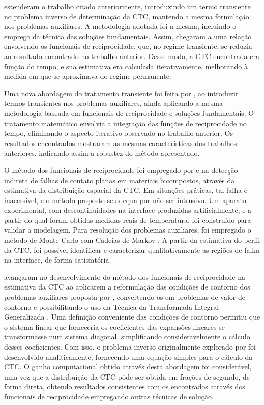 \cite{artigo_colaco_2} estenderam o trabalho citado anteriormente, introduzindo um termo transiente no problema inverso de determinação da CTC, mantendo a mesma formulação
nos problemas auxiliares. A
metodologia adotada foi a mesma, incluindo o emprego da técnica das soluções fundamentais. Assim, chegaram a uma relação envolvendo os funcionais de reciprocidade,
que, no regime transiente, se reduzia ao resultado encontrado no trabalho anterior. Desse modo, a CTC encontrada era função do tempo, e sua estimativa era calculada 
iterativamente, melhorando à medida em que se aproximava do regime permanente.

Uma nova abordagem do tratamento transiente foi feita por \cite{artigo_colaco_4},
ao introduzir termos transientes nos problemas auxiliares, ainda aplicando a mesma metodologia baseada em funcionais de reciprocidade e soluções fundamentais. O tratamento
matemático envolvia a integração das funções de reciprocidade no tempo, eliminando o aspecto iterativo observado no trabalho anterior. Os resultados encontrados mostraram
as mesmas características dos trabalhos anteriores, indicando assim a robustez do método apresentado.

O método dos funcionais de reciprocidade foi empregado por \cite{tese_abreu} e \cite{artigo_abreu_3} na detecção indireta de falhas de contato planas em materiais bicompostos, através da estimativa da distribuição espacial da CTC.
Em situações práticas, tal falha é inacessível, e o método proposto se adequa por não ser intrusivo. Um aparato experimental, com descontinuidades na interface produzidas artificialmente, e a partir
do qual foram obtidas medidas reais de temperatura, foi construído para validar a modelagem. Para resolução dos problemas auxiliares, foi empregado o método 
de Monte Carlo com Cadeias de Markov \citep{artigo_mcmc}. A partir da estimativa do perfil da CTC, foi possível identificar e caracterizar qualitativamente as regiões de falha na interface,
de forma satisfatória.

\cite{artigo_padilha_3} avançaram no desenvolvimento do método dos funcionais de reciprocidade na estimativa da CTC ao aplicarem a reformulação das condições de contorno 
dos problemas auxiliares proposta por \cite{tese_abreu}, convertendo-os em problemas de valor de contorno e possibilitando o uso da Técnica da Transformada Integral Generalizada \citep{livro_integral_transforms_cotta}.
Uma definição conveniente das condições de contorno permitiu que o sistema linear que forneceria os coeficientes das expansões lineares se transformasse num sistema diagonal, simplificando
consideravelmente o cálculo desses coeficientes. Com isso, 
o problema inverso originalmente explorado por \cite{reciproc_3} foi desenvolvido analiticamente, fornecendo uma equação simples para o cálculo da CTC. O ganho
computacional obtido através desta abordagem foi considerável, uma vez que a distribuição da CTC pôde ser obtida em frações de segundo, de forma direta, obtendo resultados consistentes
com os encontrados através dos funcionais de reciprocidade empregando outras técnicas de solução.


